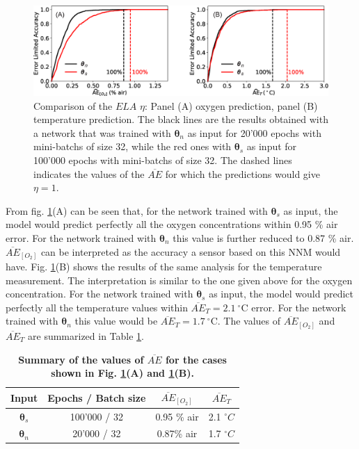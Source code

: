 \documentclass[sensors,article,submit,moreauthors,pdftex,10pt,a4paper]{Definitions/mdpi}
\begin{document}
\begin{figure}[hbt]
\centering
\includegraphics[width=14 cm]{ELA_comparison_O2_T.eps}
\caption{Comparison of the $ELA$ $\eta$: Panel (A) oxygen prediction, panel (B) temperature prediction. The black lines are the results obtained with a network that was trained with ${\pmb \theta}_n$ as input for 20'000 epochs with mini-batchs of size 32, while the red ones with ${\pmb \theta}_s$ as input for 100'000 epochs with mini-batchs of size 32. The dashed lines indicates the values of the $\overline{AE}$ for which the predictions would give $\eta=1$.}
\label{fig:ELA_result_comparison}
\end{figure}

From fig. \ref{fig:ELA_result_comparison}(A) can be seen that, for the network trained with ${\pmb \theta}_s$ as input, the model would predict perfectly all the oxygen concentrations within 0.95 \% air error. For the network trained with ${\pmb \theta}_n$ this value is further reduced to 0.87 \% air. $\overline{AE}_{[O_2]}$ can be interpreted as the accuracy a sensor based on this NNM would have.
Fig. \ref{fig:ELA_result_comparison}(B) shows the results of the same analysis for the temperature measurement. The interpretation is similar to the one given above for the oxygen concentration. For the network trained with ${\pmb \theta}_s$ as input, the model would predict perfectly all the temperature values within $\overline{AE}_{T}=2.1 \ ^\circ$C error. For the network trained with ${\pmb \theta}_n$ this value would be  $\overline{AE}_{T}=1.7 \ ^\circ$C. The values of $\overline{AE}_{[O_2]}$ and $\overline{AE}_{T}$ are summarized in Table \ref{table:ela}.

\begin{table}[htb]
\centering
\caption {\bf Summary of the values of $\overline{AE}$ for the cases shown in Fig. \ref{fig:ELA_result_comparison}(A) and \ref{fig:ELA_result_comparison}(B).}
\begin{tabular}{ cccc}
\smallskip 
 Input & Epochs / Batch size & $\overline{AE}_{[O_2]}$ & $\overline{AE}_{T}$  \\ 
 \hline
${\pmb \theta}_s$ & 100'000 / 32 & 0.95 \% air & 2.1 $^\circ C$\\ 
${\pmb \theta}_n $ & 20'000 / 32 & 0.87\% air & 1.7 $^\circ C$\\ 
\end{tabular}
\label{table:ela}
\end{table}
\end{document}
